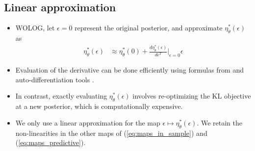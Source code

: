 \documentclass[a0,plainsections]{sciposter}\usepackage[]{graphicx}\usepackage[]{color}
\newcommand{\Expect}{\mathbb{E}}
\newcommand{\etazopt}{\eta_z^{*}}
\newcommand{\etathetaopt}{\eta_\theta^{*}}
\newcommand{\QExpect}
{\Expect_{q\left(\theta, z \vert \eta_\theta, \etazopt(\eta_\theta)\right)}}
\newcommand{\atzero}{\Big\rvert_{\eta_\theta = \etathetaopt, \epsilon = 0}}
\begin{document}
\begin{minipage}[t]{0.45\textwidth}
\vspace{-0.7in}
\subsection*{Linear approximation}
\vspace{-0.2in}
\begin{itemize}
\item WOLOG, let $\epsilon=0$ represent the original posterior, and approximate $\etathetaopt(\epsilon)$ as  
\begin{align}
\etathetaopt(\epsilon)  &\approx  \etathetaopt(0) + 
\frac{d \etathetaopt(\epsilon)}{d\epsilon^T}\Big|_{\epsilon=0} \epsilon
\label{eq:linear_approx}
\end{align}

\item Evaluation of the derivative can be done efficiently using formulas from \cite{giordano:2017:covariances} and auto-differentiation tools \cite{maclaurin:2015:autograd}.

\item In contrast, exactly evaluating $\etathetaopt(\epsilon)$ involves re-optimizing the KL objective at a new posterior, which is computationally expensive. 

\item We only use a linear approximation for the map $\epsilon \mapsto \etathetaopt(\epsilon)$. {We retain the non-linearities in the other maps of (\ref{eq:maps_in_sample}) and (\ref{eq:maps_predictive}). }


\end{itemize}

\end{minipage}
\hfill \vrule \hfill
\end{document}
